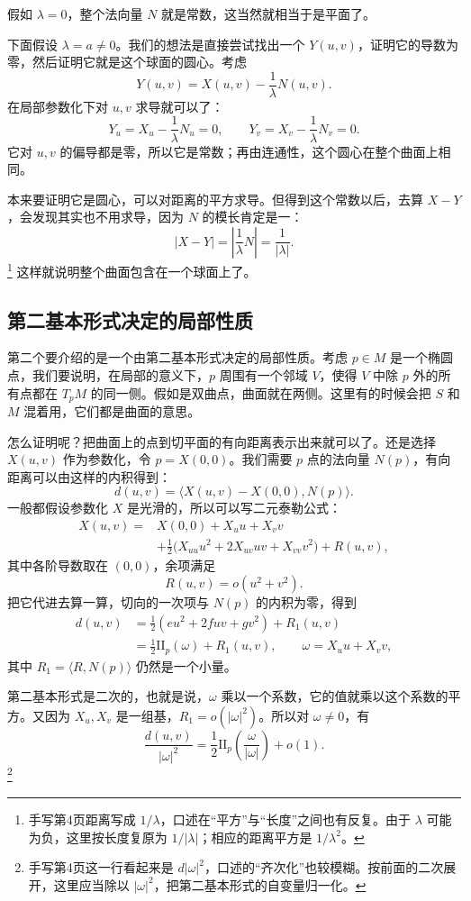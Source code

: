 \documentclass[UTF8,11pt,a4paper]{ctexart}
\newcommand{\ip}[2]{\langle #1,#2\rangle}
\newcommand{\II}{\mathrm{II}}
\begin{document}
假如 $\lambda=0$，整个法向量 $N$ 就是常数，这当然就相当于是平面了。

下面假设 $\lambda=a\ne0$。我们的想法是直接尝试找出一个 $Y(u,v)$，证明它的导数为零，然后证明它就是这个球面的圆心。考虑
\[
Y(u,v)=X(u,v)-\frac1\lambda N(u,v).
\]
在局部参数化下对 $u,v$ 求导就可以了：
\[
Y_u=X_u-\frac1\lambda N_u=0,\qquad
Y_v=X_v-\frac1\lambda N_v=0.
\]
它对 $u,v$ 的偏导都是零，所以它是常数；再由连通性，这个圆心在整个曲面上相同。

本来要证明它是圆心，可以对距离的平方求导。但得到这个常数以后，去算 $X-Y$，会发现其实也不用求导，因为 $N$ 的模长肯定是一：
\[
|X-Y|=\left|\frac1\lambda N\right|=\frac1{|\lambda|}.
\]\footnote{手写第4页距离写成 $1/\lambda$，口述在“平方”与“长度”之间也有反复。由于 $\lambda$ 可能为负，这里按长度复原为 $1/|\lambda|$；相应的距离平方是 $1/\lambda^2$。}
这样就说明整个曲面包含在一个球面上了。

\subsection{第二基本形式决定的局部性质}

第二个要介绍的是一个由第二基本形式决定的局部性质。考虑 $p\in M$ 是一个椭圆点，我们要说明，在局部的意义下，$p$ 周围有一个邻域 $V$，使得 $V$ 中除 $p$ 外的所有点都在 $T_pM$ 的同一侧。假如是双曲点，曲面就在两侧。这里有的时候会把 $S$ 和 $M$ 混着用，它们都是曲面的意思。

怎么证明呢？把曲面上的点到切平面的有向距离表示出来就可以了。还是选择 $X(u,v)$ 作为参数化，令 $p=X(0,0)$。我们需要 $p$ 点的法向量 $N(p)$，有向距离可以由这样的内积得到：
\[
d(u,v)=\ip{X(u,v)-X(0,0)}{N(p)}.
\]
一般都假设参数化 $X$ 是光滑的，所以可以写二元泰勒公式：
\[
\begin{aligned}
X(u,v)={}&X(0,0)+X_u u+X_v v\\
&+\frac12\bigl(X_{uu}u^2+2X_{uv}uv+X_{vv}v^2\bigr)+R(u,v),
\end{aligned}
\]
其中各阶导数取在 $(0,0)$，余项满足
\[
R(u,v)=o(u^2+v^2).
\]
把它代进去算一算，切向的一次项与 $N(p)$ 的内积为零，得到
\[
\begin{aligned}
d(u,v)&=\frac12(eu^2+2fuv+gv^2)+R_1(u,v)\\
&=\frac12\II_p(\omega)+R_1(u,v),\qquad
\omega=X_u u+X_v v,
\end{aligned}
\]
其中 $R_1=\ip{R}{N(p)}$ 仍然是一个小量。

第二基本形式是二次的，也就是说，$\omega$ 乘以一个系数，它的值就乘以这个系数的平方。又因为 $X_u,X_v$ 是一组基，$R_1=o(|\omega|^2)$。所以对 $\omega\ne0$，有
\[
\frac{d(u,v)}{|\omega|^2}
=\frac12\II_p\left(\frac{\omega}{|\omega|}\right)+o(1).
\]\footnote{手写第4页这一行看起来是 $d|\omega|^2$，口述的“齐次化”也较模糊。按前面的二次展开，这里应当除以 $|\omega|^2$，把第二基本形式的自变量归一化。}
\end{document}
